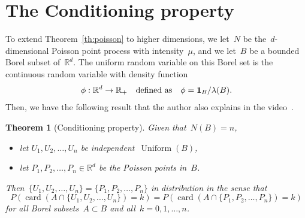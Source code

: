 \documentclass[letterpaper,11pt,twoside,keywordsasfootnote,addressatend,noinfoline]{article}
\newtheorem{theorem}{Theorem}
\newcommand{\R}{\mathbb{R}}
\newcommand{\ind}{\mathbf{1}}
\DeclareMathOperator{\uniform}{Uniform}
\DeclareMathOperator{\card}{card}
\begin{document}
\section{The Conditioning property}
 To extend Theorem~\ref{th:poisson} to higher dimensions, we let~$N$ be the~$d$-dimensional Poisson point process with intensity~$\mu$, and we let~$B$ be a bounded Borel subset of~$\R^d$.
 The uniform random variable on this Borel set is the continuous random variable with density function
 $$ \phi : \R^d \to \R_+ \quad \hbox{defined as} \quad \phi = \ind_B / \lambda (B). $$
 Then, we have the following result that the author also explains in the video~\cite{lanchier_2024}.
\begin{theorem}[Conditioning property]
 Given that~$N (B) = n$,
\begin{itemize}
\item let $U_1, U_2, \ldots, U_n$ be independent~$\uniform (B)$, \vspace*{4pt}
\item let $P_1, P_2, \ldots, P_n \in \R^d$ be the Poisson points in~$B$.
\end{itemize}
 Then~$\{U_1, U_2, \ldots, U_n \} = \{P_1, P_2, \ldots, P_n \}$ in distribution in the sense that
 $$ P (\card (A \cap \{U_1, U_2, \ldots, U_n \}) = k) = P (\card (A \cap \{P_1, P_2, \ldots, P_n \}) = k) $$
 for all Borel subsets~$A \subset B$ and all~$k = 0, 1, \ldots, n$.
\end{theorem}
\end{document}
